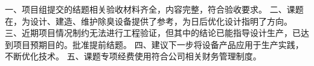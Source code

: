 一、项目组提交的结题相关验收材料齐全，内容完整，符合验收要求。
二、课题在，为设计、建造、维护除臭设备提供了参考，为日后优化设计指明了方向。
三、近期项目情况制约无法进行工程验证，但其中的结论已能指导设计生产，已达到项目预期目的。批准提前结题。
四、建议下一步将设备产品应用于生产实践，不断优化技术。
五、课题专项经费使用符合公司相关财务管理制度。
